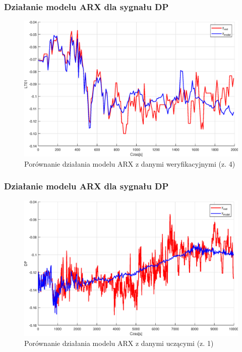 \addtocounter{framenumber}{-1}
\begin{frame}
  \frametitle{Działanie modelu ARX dla sygnału DP}
  \begin{figure}[H]
    \centering
    \includegraphics[width=0.75\linewidth,keepaspectratio]{results_matlab/LT01_4.eps}
    \caption{Porównanie działania modelu ARX z danymi weryfikacyjnymi (z. 4)}
    \label{fig:test}
    \end{figure}
\end{frame}

\begin{frame}
  \frametitle{Działanie modelu ARX dla sygnału DP}
  \begin{figure}[H]
    \centering
    \includegraphics[width=0.75\linewidth,keepaspectratio]{results_matlab/DP_1.eps}
    \caption{Porównanie działania modelu ARX z danymi uczącymi (z. 1)}
    \label{fig:test}
    \end{figure}
\end{frame}

